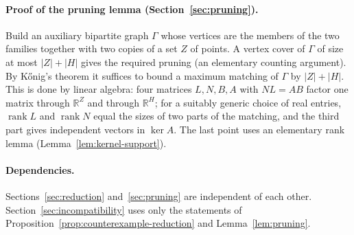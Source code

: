 \documentclass[11pt]{article}
\theoremstyle{remark}
\newcommand{\abs}[1]{\lvert #1\rvert}
\DeclareMathOperator{\rank}{rank}
\newcommand{\R}{\mathbb R}
\begin{document}
\paragraph{Proof of the pruning lemma (Section~\ref{sec:pruning}).}
Build an auxiliary bipartite graph $\Gamma$ whose vertices are the members
of the two families together with two copies of a set $Z$ of points. A
vertex cover of $\Gamma$ of size at most $\abs Z+\abs H$ gives the required
pruning (an elementary counting argument). By K\H{o}nig's theorem it
suffices to bound a maximum matching of $\Gamma$ by $\abs Z+\abs H$. This is
done by linear algebra: four matrices $L,N,B,A$ with $NL=AB$ factor one
matrix through $\R^Z$ and through $\R^H$; for a suitably generic choice of
real entries, $\rank L$ and $\rank N$ equal the sizes of two parts of the
matching, and the third part gives independent vectors in $\ker A$.
The last point uses an elementary rank lemma
(Lemma~\ref{lem:kernel-support}).

\paragraph{Dependencies.}
\begin{center}
\end{center}
Sections~\ref{sec:reduction} and~\ref{sec:pruning} are independent of each
other. Section~\ref{sec:incompatibility} uses only the statements of
Proposition~\ref{prop:counterexample-reduction} and
Lemma~\ref{lem:pruning}.
\end{document}
